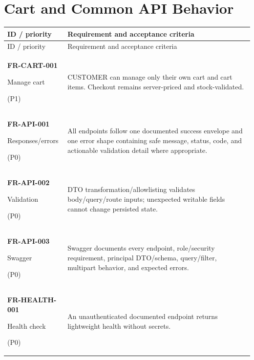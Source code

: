 \section{Cart and Common API Behavior}
\begin{longtable}{@{}p{44mm}p{109mm}@{}}
\toprule
ID / priority & Requirement and acceptance criteria \\
\midrule
\endfirsthead
\toprule
ID / priority & Requirement and acceptance criteria \\
\midrule
\endhead
\textbf{FR-CART-001}\par Manage cart\par (P1) & CUSTOMER can manage only their own cart and cart items. Checkout remains server-priced and stock-validated. \\
\textbf{FR-API-001}\par Responses/errors\par (P0) & All endpoints follow one documented success envelope and one error shape containing safe message, status, code, and actionable validation detail where appropriate. \\
\textbf{FR-API-002}\par Validation\par (P0) & DTO transformation/allowlisting validates body/query/route inputs; unexpected writable fields cannot change persisted state. \\
\textbf{FR-API-003}\par Swagger\par (P0) & Swagger documents every endpoint, role/security requirement, principal DTO/schema, query/filter, multipart behavior, and expected errors. \\
\textbf{FR-HEALTH-001}\par Health check\par (P0) & An unauthenticated documented endpoint returns lightweight health without secrets. \\
\bottomrule
\end{longtable}
